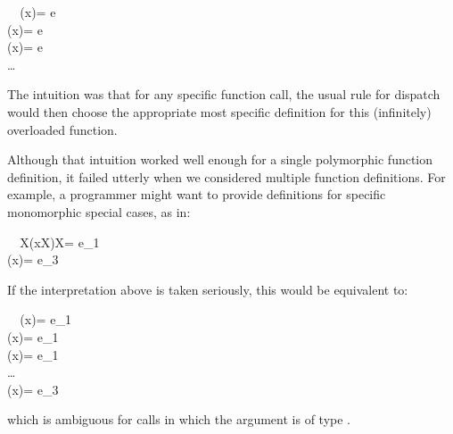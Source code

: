 \documentclass[10pt]{sigplanconf}
\begin{document}
\small
\begin{FortressCode}
{\tt ~~}\+\bigl(x\COLON {}\llbracket{}\rrbracket\bigr)\COLON {}\llbracket{}\rrbracket = e \\
  \bigl(x\COLON {}\llbracket{}\rrbracket\bigr)\COLON {}\llbracket{}\rrbracket = e \\
  \bigl(x\COLON {}\llbracket{}\rrbracket\bigr)\COLON {}\llbracket{}\rrbracket = e \\
  \ldots\-
\end{FortressCode}
\normalsize
The intuition was that for any specific function call,
the usual rule for dispatch would then choose 
the appropriate most specific definition 
for this (infinitely) overloaded function.

Although that intuition worked well enough 
for a single polymorphic function definition,
it failed utterly when we considered multiple function definitions.
For example, 
a programmer might want to provide definitions 
for specific monomorphic special cases, as in:

\small
\begin{FortressCode}
{\tt ~~}\+\llbracket{}X\rrbracket\bigl(x\COLON {}\llbracket{}X\rrbracket\bigr)\COLON {}\llbracket{}X\rrbracket = e_1 \\
  \bigl(x\COLON {}\llbracket{}\rrbracket\bigr)\COLON {}\llbracket{}\rrbracket = e_3\-
\end{FortressCode}
\normalsize
If the interpretation above is taken seriously, 
this would be equivalent to:

\small
\begin{FortressCode}
{\tt ~~}\+\bigl(x\COLON {}\llbracket{}\rrbracket\bigr)\COLON {}\llbracket{}\rrbracket = e_1 \\
  \bigl(x\COLON {}\llbracket{}\rrbracket\bigr)\COLON {}\llbracket{}\rrbracket = e_1 \\
  \bigl(x\COLON {}\llbracket{}\rrbracket\bigr)\COLON {}\llbracket{}\rrbracket = e_1 \\
  \ldots \\
  \bigl(x\COLON {}\llbracket{}\rrbracket\bigr)\COLON {}\llbracket{}\rrbracket = e_3\-
\end{FortressCode}
\normalsize
which is ambiguous for calls in which the argument is of type .
\end{document}
